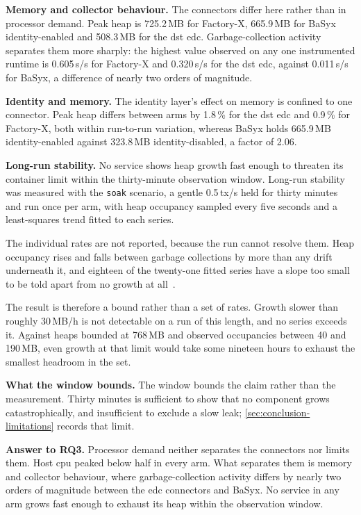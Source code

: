\textbf{Memory and collector behaviour.} The connectors differ here rather than in processor demand. Peak heap is 725.2\,MB for Factory-X, 665.9\,MB for BaSyx identity-enabled and 508.3\,MB for the \gls{dst} \gls{edc}. Garbage-collection activity separates them more sharply: the highest value observed on any one instrumented runtime is 0.605\,s/s for Factory-X and 0.320\,s/s for the \gls{dst} \gls{edc}, against 0.011\,s/s for BaSyx, a difference of nearly two orders of magnitude.

\textbf{Identity and memory.} The identity layer's effect on memory is confined to one connector. Peak heap differs between arms by 1.8\,\% for the \gls{dst} \gls{edc} and 0.9\,\% for Factory-X, both within run-to-run variation, whereas BaSyx holds 665.9\,MB identity-enabled against 323.8\,MB identity-disabled, a factor of 2.06.

\textbf{Long-run stability.} No service shows heap growth fast enough to threaten its container limit within the thirty-minute observation window. Long-run
stability was measured with the \texttt{soak} scenario, a gentle 0.5\,tx/s held for
thirty minutes and run once per arm, with heap occupancy sampled every five seconds and
a least-squares trend fitted to each series.

The individual rates are not reported, because the run cannot resolve them. Heap occupancy rises and falls between garbage collections by more than any drift underneath it, and eighteen of the twenty-one fitted series have a slope too small to be told apart from no growth at all~\citep{hoefler2015scientific}.

The result is therefore a bound rather than a set of rates. Growth slower than roughly 30\,MB/h is not detectable on a run of this length,
and no series exceeds it. Against heaps bounded at 768\,MB and observed occupancies
between 40 and 190\,MB, even growth at that limit would take some nineteen hours to
exhaust the smallest headroom in the set.

\textbf{What the window bounds.} The window bounds the claim rather than the measurement. Thirty minutes is sufficient to
show that no component grows catastrophically, and insufficient to exclude a slow leak;
\cref{sec:conclusion-limitations} records that limit.

\textbf{Answer to RQ3.} Processor demand neither separates the connectors nor limits them. Host \gls{cpu} peaked below half in every arm. What separates them is memory and collector behaviour, where garbage-collection activity differs by nearly two orders of magnitude between the \gls{edc} connectors and BaSyx. No service in any arm grows fast enough to exhaust its heap within the observation window.

